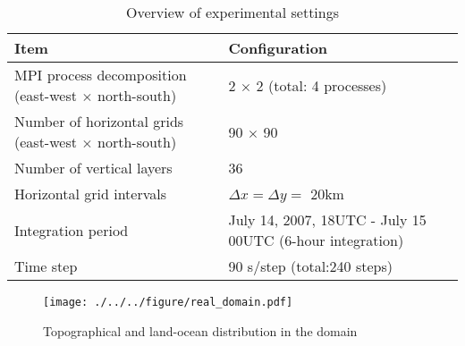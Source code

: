 \begin{table}[tb]
\begin{center}
  \caption{Overview of experimental settings}
  \label{tab:grids}
  \begin{tabularx}{150mm}{|l|X|} \hline
    \rowcolor[gray]{0.9} Item & Configuration \\ \hline
    MPI process decomposition (east-west $\times$ north-south) & 2 $\times$ 2 (total: 4 processes) \\ \hline
    Number of horizontal grids (east-west $\times$ north-south) & 90 $\times$ 90  \\ \hline
    Number of vertical layers   & 36                   \\ \hline
    Horizontal grid intervals   & $\Delta x  = \Delta y = $ 20km       \\ \hline
    Integration period & July 14, 2007, 18UTC - July 15 00UTC (6-hour integration) \\ \hline
    Time step & 90 s/step (total:240 steps) \\ \hline
  \end{tabularx}
\end{center}
\end{table}

\begin{figure}[tb]
\begin{center}
  \texttt{[image: ./../../figure/real\_domain.pdf]}\\
  \caption{Topographical and land-ocean distribution in the domain}
  \label{fig:tutorial_real_domain}
\end{center}
\end{figure}


